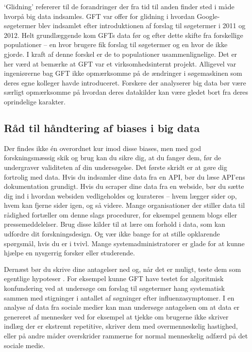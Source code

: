\documentclass[12pt,]{article}
\begin{document}
`Glidning' refererer til de forandringer der fra tid til anden finder
sted i måde hvorpå big data indsamles. GFT var offer for glidning i
hvordan Google-søgetermer blev indsamlet efter introduktionen af forslag
til søgetermer i 2011 og 2012. Helt grundlæggende kom GFTs data før og
efter dette skifte fra forskellige populationer -- en hvor brugere fik
forslag til søgetermer og en hvor de ikke gjorde. I kraft af denne
forskel er de to populationer usammenlignelige. Det er her værd at
bemærke at GFT var et virksomhedsinternt projekt. Alligevel var
ingeniørerne bag GFT ikke opmærksomme på de ændringer i søgemaskinen som
deres egne kolleger havde introduceret. Forskere der analyserer big data
bør være særligt opmærksomme på hvordan deres datakilder kan være gledet
bort fra deres oprindelige karakter.

\hypertarget{ruxe5d-til-huxe5ndtering-af-biases-i-big-data}{%
\subsection{Råd til håndtering af biases i big
data}\label{ruxe5d-til-huxe5ndtering-af-biases-i-big-data}}

Der findes ikke én overordnet kur imod disse biases, men med god
forskningsmæssig skik og brug kan du sikre dig, at du fanger dem, før de
undergraver validiteten af din undersøgelse. Det første skridt er at
gøre dig fortrolig med data. Hvis du indsamler dine data fra en API, bør
du læse API'ens dokumentation grundigt. Hvis du scraper dine data fra en
webside, bør du sætte dig ind i hvordan websiden vedligeholdes og
kurateres -- hvem lægger sider op, hvem kan fjerne sider igen, og så
videre. Mange organisationer der stiller data til rådighed fortæller om
denne slags procedurer, for eksempel gennem blogs eller
pressemeddelelser. Brug disse kilder til at lære om forhold i data, som
kan udfordre dit forskningsdesign. Og vær ikke bange for at stille
opklarende spørgsmål, hvis du er i tvivl. Mange systemadministratorer er
glade for at kunne hjælpe en nysgerrig forsker eller studerende.

Dernæst bør du skrive dine antagelser ned og, når det er muligt, teste
dem som egentlige hypoteser \citep{LBCC16}. For eksempel kunne GFT have
testet for algoritmisk konfundering ved at undersøge om forslag til
søgetermer hang systematisk sammen med stigninger i antallet af
søgninger efter influenzasymptomer. I en analyse af data fra sociale
medier kan man undersøge antagelsen om at data er genereret af mennesker
ved for eksempel at tjekke om brugerne ikke skriver indlæg der er
ekstremt repetitive, skriver dem med overmenneskelig hastighed, eller på
andre måder overskrider rammerne for normal menneskelig adfærd på det
sociale medie.
\end{document}
